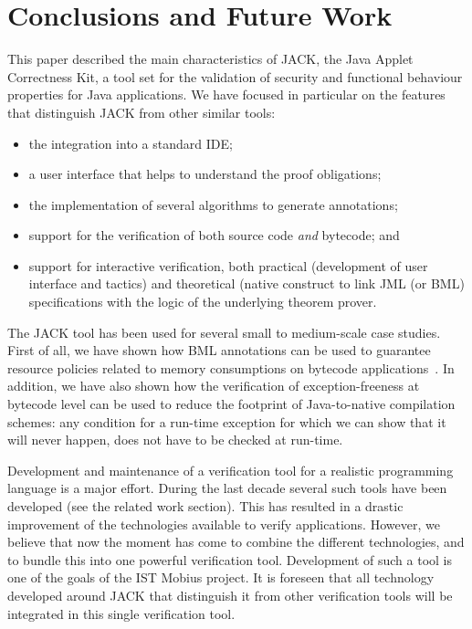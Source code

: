 \section{Conclusions and Future Work}\label{SecConcl}

This paper described the main characteristics of JACK, the Java Applet
Correctness Kit, a tool set for the validation of security and
functional behaviour properties for Java applications. We have focused
in particular on the features that distinguish JACK from other similar
tools:
\begin{itemize}
\item the integration into a standard IDE;
\item a user interface that helps to understand the proof obligations;
\item the implementation of several algorithms to generate
annotations;
\item support for the verification of both source code \emph{and}
bytecode; and
\item support for interactive verification, both practical
(development of user interface and tactics) and theoretical (native
construct to link JML (or BML) specifications with the logic of the
underlying theorem prover.
\end{itemize}

The JACK tool has been used for several small to medium-scale case
studies. First of all, we have shown how BML annotations can be
used to guarantee resource policies related to memory consumptions on
bytecode applications~\cite{gmg05:sefm}. In addition, we have also
shown how the verification of exception-freeness at bytecode level can
be used to reduce the footprint of Java-to-native compilation schemes:
any condition for a run-time exception for which we can show that it
will never happen, does not have to be checked at run-time.


Development and maintenance of a verification tool for a realistic
programming language is a major effort. During the last decade several
such tools have been developed (see the related work section). This
has resulted in a drastic improvement of the technologies available to
verify applications. However, we believe that now the moment has come
to combine the different technologies, and to bundle this into one
powerful verification tool. Development of such a tool is one of the
goals of the IST Mobius project. It is foreseen that all technology
developed around JACK that distinguish it from other verification
tools will be integrated in this single verification tool. 

